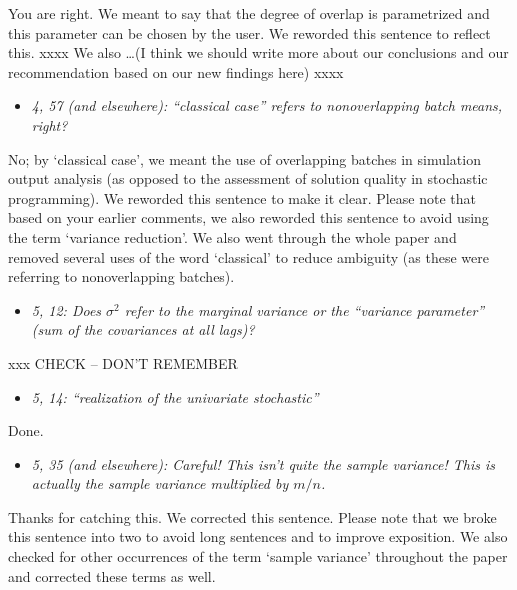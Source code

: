 \documentclass[11pt,notitlepage,onecolumn]{article}
\newcommand{\noi}{\noindent}
\begin{document}
\noi
You are right.
We meant to say that the degree of overlap is parametrized and this parameter can be chosen by the user. 
We reworded this sentence to reflect this. 
xxxx  We also \ldots (I think we should write more about our conclusions and our recommendation based on our new findings here) xxxx
\medskip 



\begin{itemize}
\item[] \textit{4, 57 (and elsewhere): ``classical case'' refers to nonoverlapping batch means, right?}
\end{itemize}

\noi
No; by `classical case', we meant the use of overlapping batches in simulation output analysis (as opposed to the assessment of solution quality in stochastic programming). 
We reworded this sentence to make it clear. 
Please note that based on your earlier comments, we also reworded this sentence to avoid using the term `variance reduction'. 
We also went through the whole paper and removed several uses of the word `classical' to reduce ambiguity (as these were referring to nonoverlapping batches). 
\medskip 



\begin{itemize}
\item[] \textit{5, 12: Does $\sigma^2$ refer to the marginal variance or the ``variance parameter'' (sum of the covariances at all lags)?}
\end{itemize}

\noi
xxx   CHECK -- DON'T REMEMBER
\medskip 



\begin{itemize}
\item[] \textit{5, 14: ``realization of the univariate stochastic''}
\end{itemize}

\noi
Done.  
\medskip 


\begin{itemize}
\item[] \textit{5, 35 (and elsewhere): Careful! This isn't quite the sample variance! This is actually the sample variance multiplied by $m/n$.}
\end{itemize}

\noi
Thanks for catching this. 
We corrected this sentence. 
Please note that we broke this sentence into two to avoid long sentences and to improve exposition. 
We also checked for other occurrences of the term `sample variance' throughout the paper and corrected these terms as well. 
\medskip 
\end{document}
